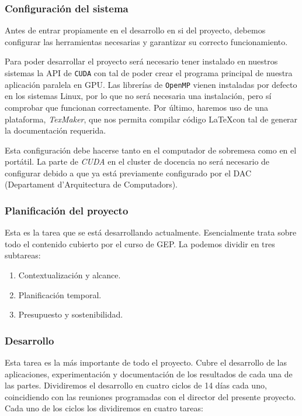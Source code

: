 \documentclass[titlepage,12pt]{report}
\begin{document}
\subsubsection{Configuración del sistema}

Antes de entrar propiamente en el desarrollo en si del proyecto, debemos configurar las herramientas necesarias y garantizar su correcto funcionamiento.

Para poder desarrollar el proyecto será necesario tener instalado en nuestros sistemas la API de \texttt{CUDA} con tal de poder crear el programa principal de nuestra aplicación paralela en GPU. Las librerías de \texttt{OpenMP} vienen instaladas por defecto en los sistemas Linux, por lo que no será necesaria una instalación, pero sí comprobar que funcionan correctamente. Por último, haremos uso de una plataforma, \textit{TexMaker}, que nos permita compilar código \LaTeX con tal de generar la documentación requerida.

Esta configuración debe hacerse tanto en el computador de sobremesa como en el portátil. La parte de \textit{CUDA} en el cluster de docencia no será necesario de configurar debido a que ya está previamente configurado por el DAC (Departament d'Arquitectura de Computadors). 

\subsubsection{Planificación del proyecto}

Esta es la tarea que se está desarrollando actualmente. Esencialmente trata sobre todo el contenido cubierto por el curso de GEP. La podemos dividir en tres subtareas:

\begin{enumerate}
		\item Contextualización y alcance.
		\item Planificación temporal.
		\item Presupuesto y sostenibilidad.
\end{enumerate}

\subsubsection{Desarrollo}

Esta tarea es la más importante de todo el proyecto. Cubre el desarrollo de las aplicaciones, experimentación y documentación de los resultados de cada una de las partes. Dividiremos el desarrollo en cuatro ciclos de 14 días cada uno, coincidiendo con las reuniones programadas con el director del presente proyecto. Cada uno de los ciclos los dividiremos en cuatro tareas:
\end{document}
